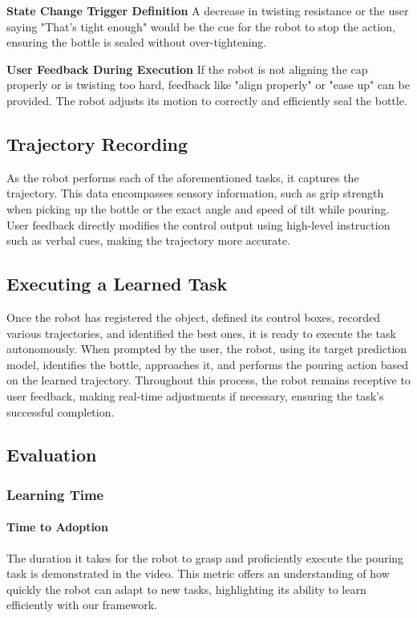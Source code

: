 \documentclass[conference]{IEEEtran}
\begin{document}
\textbf{State Change Trigger Definition}
A decrease in twisting resistance or the user saying "That's tight enough" would be the cue for the robot to stop the action, ensuring the bottle is sealed without over-tightening.

\textbf{User Feedback During Execution}
If the robot is not aligning the cap properly or is twisting too hard, feedback like "align properly" or "ease up" can be provided. The robot adjusts its motion to correctly and efficiently seal the bottle. 

\subsection{Trajectory Recording}

As the robot performs each of the aforementioned tasks, it captures the trajectory. This data encompasses sensory information, such as grip strength when picking up the bottle or the exact angle and speed of tilt while pouring. User feedback directly modifies the control output using high-level instruction such as verbal cues, making the trajectory more accurate.

\subsection{Executing a Learned Task}

Once the robot has registered the object, defined its control boxes, recorded various trajectories, and identified the best ones, it is ready to execute the task autonomously. When prompted by the user, the robot, using its target prediction model, identifies the bottle, approaches it, and performs the pouring action based on the learned trajectory. Throughout this process, the robot remains receptive to user feedback, making real-time adjustments if necessary, ensuring the task's successful completion.

\subsection{Evaluation}

\subsubsection{Learning Time}

\paragraph{Time to Adoption}
The duration it takes for the robot to grasp and proficiently execute the pouring task is demonstrated in the video. This metric offers an understanding of how quickly the robot can adapt to new tasks, highlighting its ability to learn efficiently with our framework.
\end{document}
